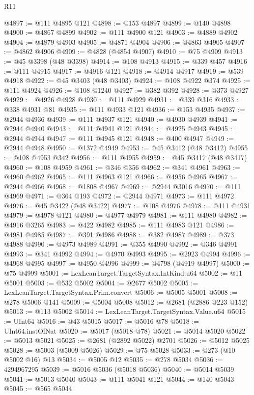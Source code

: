 \begin{lexlean}{R11}
\begin{coremodule}
{{{{{{{{{{{{{{{{{{{{{{{{{{{{{{{{{{{{{{{{{{{{{{{{{{{{{{{{{{{{{{{{{{{{{{{{{{{{{{{{{{@4897 := @111 @4895 @121
@4898 := @153 @4897
@4899 := @140 @4898
@4900 := @4867 @4899
@4902 := @111 @4900 @121
@4903 := @4889 @4902
@4904 := @4879 @4903
@4905 := @4871 @4904
@4906 := @4863 @4905
@4907 := @4862 @4906
@4909 := @4828 (@4854 @4907)
@4910 := @75 @4909
@4913 := @45 @3398 (@48 @3398)
@4914 := @108 @4913
@4915 := @339 @457
@4916 := @111 @4915
@4917 := @4916 @121
@4918 := @4914 @4917
@4919 := @539 @4918
@4922 := @45 @3403 (@48 @3403)
@4924 := @108 @4922 @374
@4925 := @111 @4924
@4926 := @108 @1240
@4927 := @382 @392
@4928 := @373 @4927
@4929 := @4926 @4928
@4930 := @111 @4929
@4931 := @339 @316
@4933 := @338 @4931 @81
@4935 := @111 @4933 @121
@4936 := @153 @4935
@4937 := @2944 @4936
@4939 := @111 @4937 @121
@4940 := @4930 @4939
@4941 := @2944 @4940
@4943 := @111 @4941 @121
@4944 := @4925 @4943
@4945 := @2944 @4944
@4947 := @111 @4945 @121
@4948 := @400 @4947
@4949 := @2944 @4948
@4950 := @1372 @4949
@4953 := @45 @3412 (@48 @3412)
@4955 := @108 @4953 @342
@4956 := @111 @4955
@4959 := @45 @3417 (@48 @3417)
@4960 := @108 @4959
@4961 := @346 @356
@4962 := @341 @4961
@4963 := @4960 @4962
@4965 := @111 @4963 @121
@4966 := @4956 @4965
@4967 := @2944 @4966
@4968 := @1808 @4967
@4969 := @2944 @3016
@4970 := @111 @4969
@4971 := @364 @193
@4972 := @2944 @4971
@4973 := @111 @4972
@4976 := @45 @3422 (@48 @3422)
@4977 := @108 @4976
@4978 := @111 @4931
@4979 := @4978 @121
@4980 := @4977 @4979
@4981 := @111 @4980
@4982 := @4916 @3265
@4983 := @422 @4982
@4985 := @111 @4983 @121
@4986 := @4981 @4985
@4987 := @391 @4986
@4988 := @382 @4987
@4989 := @373 @4988
@4990 := @4973 @4989
@4991 := @355 @4990
@4992 := @346 @4991
@4993 := @341 @4992
@4994 := @4970 @4993
@4995 := @2923 @4994
@4996 := @4968 @4995
@4997 := @4950 @4996
@4999 := @4798 (@4919 @4997)
@5000 := @75 @4999
@5001 := LexLeanTarget.TargetSyntax.IntKind.u64
@5002 := @11 @5001
@5003 := @532 @5002
@5004 := @2677 @5002
@5005 := LexLeanTarget.TargetSyntax.Prim.convert
@5006 := @5005 @5001
@5008 := @278 @5006 @141
@5009 := @5004 @5008
@5012 := @2681 (@2886 @223 @152)
@5013 := @113 @5002
@5014 := LexLeanTarget.TargetSyntax.Value.u64
@5015 := UInt64
@5016 := @43 @5015
@5017 := @5016 @78
@5018 := UInt64.instOfNat
@5020 := @5017 (@5018 @78)
@5021 := @5014 @5020
@5022 := @5013 @5021
@5025 := @2681 (@2892 @5022) @2701
@5026 := @5012 @5025
@5028 := @5003 (@5009 @5026)
@5029 := @75 @5028
@5033 := @273 (@10 @5002 @16) @13
@5034 := @5005 @12
@5035 := @278 @5034
@5036 := 4294967295
@5039 := @5016 @5036 (@5018 @5036)
@5040 := @5014 @5039
@5041 := @5013 @5040
@5043 := @111 @5041 @121
@5044 := @140 @5043
@5045 := @565 @5044
}}}}}}}}}}}}}}}}}}}}}}}}}}}}}}}}}}}}}}}}}}}}}}}}}}}}}}}}}}}}}}}}}}}}}}}}}}}}}}}}}}
\end{coremodule}
\end{lexlean}

